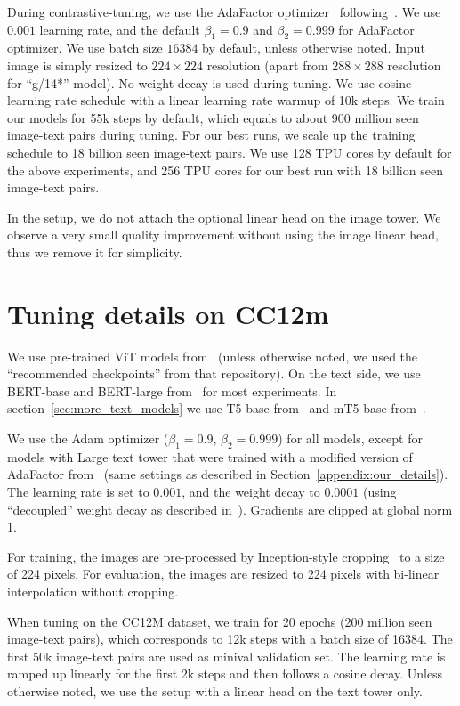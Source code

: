 During contrastive-tuning, we use the AdaFactor optimizer~\cite{adafactor} following~\cite{vitg}.
We use $0.001$ learning rate, and the default $\beta_1=0.9$ and $\beta_2=0.999$ for AdaFactor optimizer.
We use batch size $16384$ by default, unless otherwise noted.
Input image is simply resized to $224\times224$ resolution (apart from $288\times288$ resolution for “g/14*” model).
No weight decay is used during tuning.
We use cosine learning rate schedule with a linear learning rate warmup of 10k steps.
We train our models for 55k steps by default, which equals to about 900 million seen image-text pairs during tuning. 
For our best runs, we scale up the training schedule to 18 billion seen image-text pairs.
We use 128 TPU cores by default for the above experiments, and 256 TPU cores for our best run with 18 billion seen image-text pairs.


In the \Lu setup, we do not attach the optional linear head on the image tower. 
We observe a very small quality improvement without using the image linear head, thus we remove it for simplicity.

\section{Tuning details on CC12m}
\label{appendix:public_details}

We use pre-trained ViT models from~\cite{augreg} (unless otherwise noted, we used the “recommended checkpoints” from that repository). On the text side, we use BERT-base and BERT-large from~\cite{bert} for most experiments. In section~\ref{sec:more_text_models} we use T5-base from~\cite{T5} and mT5-base from~\cite{mt5}.

We use the Adam optimizer ($\beta_1=0.9$, $\beta_2=0.999$) for all models, except for models with Large text tower that were trained with a modified version of AdaFactor from~\cite{vitg} (same settings as described in Section~\ref{appendix:our_details}).
The learning rate is set to $0.001$, and the weight decay to $0.0001$ (using “decoupled” weight decay as described in~\cite{decoupled}). Gradients are clipped at global norm 1.

For training, the images are pre-processed by Inception-style cropping~\cite{inception} to a size of 224 pixels. For evaluation, the images are resized to 224 pixels with bi-linear interpolation without cropping.

When tuning on the CC12M dataset, we train for 20 epochs (200 million seen image-text pairs), which corresponds to 12k steps with a batch size of 16384. The first 50k image-text pairs are used as minival validation set.
The learning rate is ramped up linearly for the first 2k steps and then follows a cosine decay.
Unless otherwise noted, we use the \LU setup with a linear head on the text tower only.


